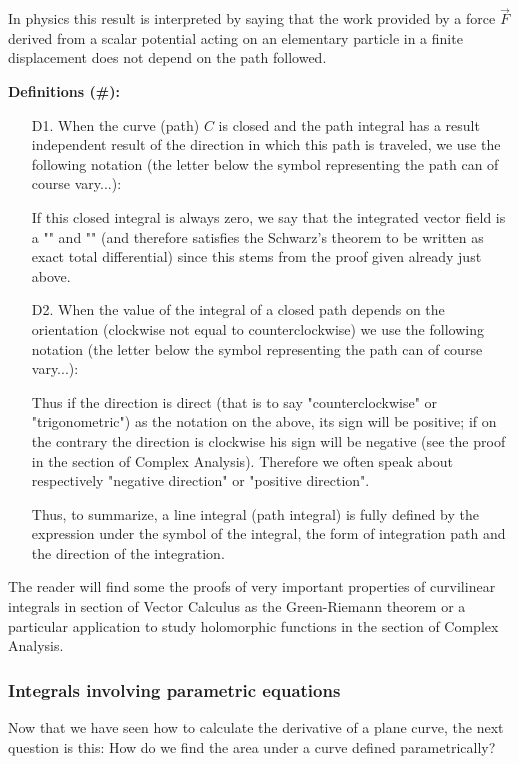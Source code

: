 	In physics this result is interpreted by saying that the work provided by a force $\vec{F}$ derived from a scalar potential acting on an elementary particle in a finite displacement does not depend on the path followed.
	
	\textbf{Definitions (\#\mydef):}
	\begin{enumerate}
		\item[D1.] When the curve (path) $C$ is closed and the path integral has a result independent result of the direction in which this path is traveled, we use the following notation (the letter below the symbol representing the path can of course vary...):
		
		If this closed integral is always zero, we say that the integrated vector field is a "" and "" (and therefore satisfies the Schwarz's theorem to be written as exact total differential) since this stems from the proof given already just above.
		
		\item[D2.] \label{closed path orientation}When the value of the integral of a closed path depends on the orientation (clockwise not equal to counterclockwise) we use the following notation (the letter below the symbol representing the path can of course vary...):
		
		Thus if the direction is direct (that is to say "counterclockwise" or "trigonometric") as the notation on the above, its sign will be positive; if on the contrary the direction is clockwise his sign will be negative (see the proof in the section of Complex Analysis). Therefore we often speak about respectively "negative direction" or "positive direction".
		
		Thus, to summarize, a line integral (path integral) is fully defined by the expression under the symbol of the integral, the form of integration path and the direction of the integration.
	\end{enumerate}
	\begin{tcolorbox}[title=Remark,colframe=black,arc=10pt]
	The reader will find some the proofs of very important properties of curvilinear integrals  in section of Vector Calculus as the Green-Riemann theorem or a particular application to study holomorphic functions in the section of Complex Analysis.
	\end{tcolorbox}
	
	\subsubsection{Integrals involving parametric equations}
	Now that we have seen how to calculate the derivative of a plane curve, the next question is this: How do we find the area under a curve defined parametrically? 
	
